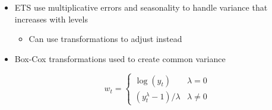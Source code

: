 \documentclass{article}\usepackage[]{graphicx}\usepackage[]{color}
\begin{document}
\begin{itemize}
        \item ETS use multiplicative errors and seasonality to handle variance that increases with levels
    \begin{itemize}
        \item Can use transformations to adjust instead
    \end{itemize}
    \item Box-Cox transformations used to create common variance
    
    \[ 
        w_t = \begin{cases}
        \log(y_t) & \lambda = 0 \\
        \left(y_t^\lambda - 1\right)/\lambda & \lambda \neq 0
        \end{cases}
    \]


\end{itemize}
\end{document}
